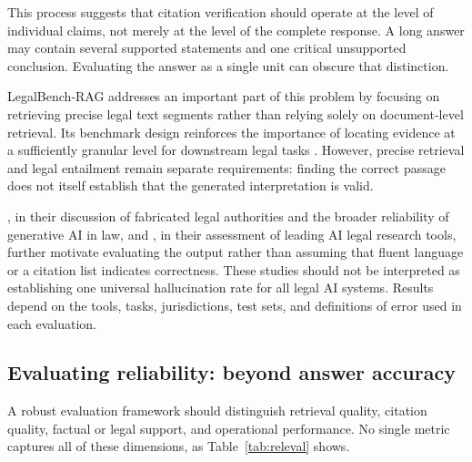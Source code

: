 This process suggests that citation verification should operate at the level of individual claims, not
merely at the level of the complete response. A long answer may contain several supported statements and
one critical unsupported conclusion. Evaluating the answer as a single unit can obscure that distinction.

LegalBench-RAG addresses an important part of this problem by focusing on retrieving precise legal text
segments rather than relying solely on document-level retrieval. Its benchmark design reinforces the
importance of locating evidence at a sufficiently granular level for downstream legal tasks
\citep{pipitone2024}. However, precise retrieval and legal entailment remain separate requirements:
finding the correct passage does not itself establish that the generated interpretation is valid.

\citet{dahl2024}, in their discussion of fabricated legal authorities and the broader reliability of
generative AI in law, and \citet{magesh2025}, in their assessment of leading AI legal research tools,
further motivate evaluating the output rather than assuming that fluent language or a citation list
indicates correctness. These studies should not be interpreted as establishing one universal
hallucination rate for all legal AI systems. Results depend on the tools, tasks, jurisdictions, test
sets, and definitions of error used in each evaluation.

\subsection{Evaluating reliability: beyond answer accuracy}

A robust evaluation framework should distinguish retrieval quality, citation quality, factual or legal
support, and operational performance. No single metric captures all of these dimensions, as
Table~\ref{tab:releval} shows.

